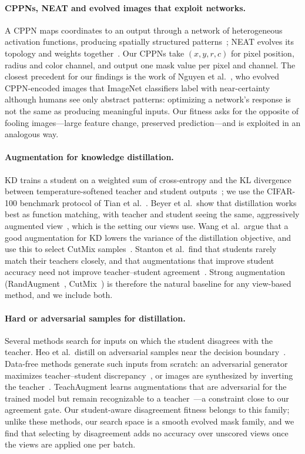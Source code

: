 \documentclass[sigconf,review,anonymous]{acmart}
\begin{document}
\paragraph{CPPNs, NEAT and evolved images that exploit networks.} A CPPN
maps coordinates to an output through a network of heterogeneous
activation functions, producing spatially structured
patterns~\cite{stanley2007cppn}; NEAT evolves its topology and weights
together~\cite{stanley2002neat}. Our CPPNs take $(x, y, r, c)$ for pixel
position, radius and color channel, and output one mask value per pixel
and channel. The closest precedent for our findings is the work of Nguyen
et al.~\cite{nguyen2015fooled}, who evolved CPPN-encoded images that
ImageNet classifiers label with near-certainty although humans see only
abstract patterns: optimizing a network's response is not the same as
producing meaningful inputs. Our fitness asks for the opposite of fooling
images---large feature change, preserved prediction---and is exploited in
an analogous way.

\paragraph{Augmentation for knowledge distillation.} KD trains a student on
a weighted sum of cross-entropy and the KL divergence between
temperature-softened teacher and student outputs~\cite{hinton2015distilling};
we use the CIFAR-100 benchmark protocol of Tian et al.~\cite{tian2020crd}.
Beyer et al.\ show that distillation works best as function matching, with
teacher and student seeing the same, aggressively augmented
view~\cite{beyer2022patient}, which is the setting our views use. Wang et
al.\ argue that a good augmentation for KD lowers the variance of the
distillation objective, and use this to select CutMix
samples~\cite{wang2022augkd}. Stanton et al.\ find that students rarely
match their teachers closely, and that augmentations that improve student
accuracy need not improve teacher--student agreement~\cite{stanton2021kd}.
Strong augmentation (RandAugment~\cite{cubuk2020randaugment},
CutMix~\cite{yun2019cutmix}) is therefore the natural baseline for any
view-based method, and we include both.

\paragraph{Hard or adversarial samples for distillation.} Several methods
search for inputs on which the student disagrees with the teacher.
Heo et al.\ distill on adversarial samples near the decision
boundary~\cite{heo2019boundary}. Data-free methods generate such inputs
from scratch: an adversarial generator maximizes teacher--student
discrepancy~\cite{micaelli2019zeroshot,fang2019datafree}, or images are
synthesized by inverting the teacher~\cite{yin2020dreaming}. TeachAugment
learns augmentations that are adversarial for the trained model but remain
recognizable to a teacher~\cite{suzuki2022teachaugment}---a constraint
close to our agreement gate. Our student-aware disagreement fitness belongs
to this family; unlike these methods, our search space is a smooth
evolved mask family, and we find that selecting by disagreement adds no
accuracy over unscored views once the views are applied one per batch.
\end{document}
